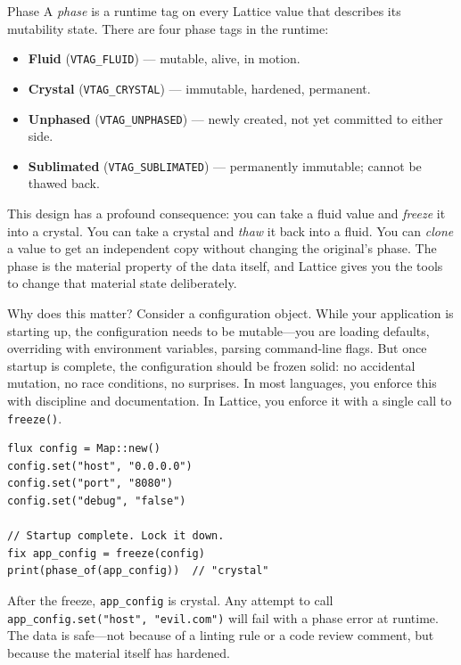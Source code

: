 \begin{defnbox}{Phase}
A \emph{phase} is a runtime tag on every Lattice value that describes its mutability state.
There are four phase tags in the runtime:
\begin{itemize}
  \item \textbf{Fluid} (\lstinline|VTAG_FLUID|) --- mutable, alive, in motion.
  \item \textbf{Crystal} (\lstinline|VTAG_CRYSTAL|) --- immutable, hardened, permanent.
  \item \textbf{Unphased} (\lstinline|VTAG_UNPHASED|) --- newly created, not yet committed to either side.
  \item \textbf{Sublimated} (\lstinline|VTAG_SUBLIMATED|) --- permanently immutable; cannot be thawed back.
\end{itemize}
\end{defnbox}

This design has a profound consequence: you can take a fluid value and \emph{freeze} it into a crystal.
You can take a crystal and \emph{thaw} it back into a fluid.
You can \emph{clone} a value to get an independent copy without changing the original's phase.
The phase is the material property of the data itself, and Lattice gives you the tools to change that material state deliberately.

Why does this matter?
Consider a configuration object.
While your application is starting up, the configuration needs to be mutable---you are loading defaults, overriding with environment variables, parsing command-line flags.
But once startup is complete, the configuration should be frozen solid: no accidental mutation, no race conditions, no surprises.
In most languages, you enforce this with discipline and documentation.
In Lattice, you enforce it with a single call to \lstinline|freeze()|.

\begin{lstlisting}[language=Lattice, caption={Freezing a configuration after setup}]
flux config = Map::new()
config.set("host", "0.0.0.0")
config.set("port", "8080")
config.set("debug", "false")

// Startup complete. Lock it down.
fix app_config = freeze(config)
print(phase_of(app_config))  // "crystal"
\end{lstlisting}

After the freeze, \lstinline|app_config| is crystal.
Any attempt to call \lstinline|app_config.set("host", "evil.com")| will fail with a phase error at runtime.
The data is safe---not because of a linting rule or a code review comment, but because the material itself has hardened.


